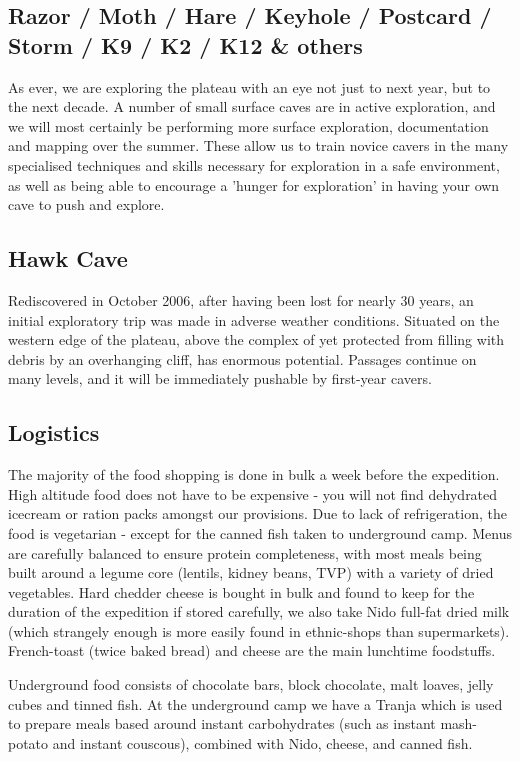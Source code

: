 \subsection{Razor / Moth / Hare / Keyhole / Postcard / Storm / K9 / K2 / K12 \& others}

As ever, we are exploring the plateau with an eye not just to next year, but to the next decade. A number of small surface caves are in active exploration, and we will most certainly be performing more surface exploration, documentation and mapping over the summer. These allow us to train novice cavers in the many specialised techniques and skills necessary for exploration in a safe environment, as well as being able to encourage a 'hunger for exploration' in having your own cave to push and explore.

\subsection{Hawk Cave}

Rediscovered in October 2006, after having been lost for nearly 30 years, an initial exploratory trip was made in adverse weather conditions. Situated on the western edge of the plateau, above the complex of  yet protected from filling with debris by an overhanging cliff,  has enormous potential. Passages continue on many levels, and it will be immediately pushable by first-year cavers.


\subsection{Logistics}

The majority of the food shopping is done in bulk a week before the expedition. High altitude food does not have to be expensive - you will not find dehydrated icecream or ration packs amongst our provisions. Due to lack of refrigeration, the food is vegetarian - except for the canned fish taken to underground camp. Menus are carefully balanced to ensure protein completeness, with most meals being built around a legume core (lentils, kidney beans, TVP) with a variety of dried vegetables. Hard chedder cheese is bought in bulk and found to keep for the duration of the expedition if stored carefully, we also take Nido full-fat dried milk (which strangely enough is more easily found in ethnic-shops than supermarkets). French-toast (twice baked bread) and cheese are the main lunchtime foodstuffs.

Underground food consists of chocolate bars, block chocolate, malt loaves, jelly cubes and tinned fish. At the underground camp we have a Tranja which is used to prepare meals based around instant carbohydrates (such as instant mash-potato and instant couscous), combined with Nido, cheese, and canned fish.

